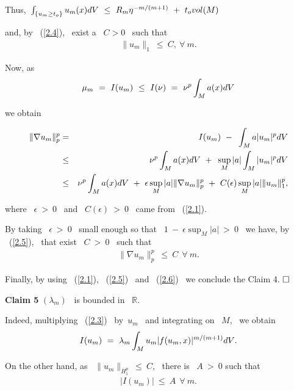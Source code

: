 \documentclass[12pt]{article}
\begin{document}
Thus, ${\displaystyle}\int_{\{u_m \geq t_o \}}{u_m(x)dV} \ \leq \ R_m\eta^{-m/(m + 1)} \ + \ t_o vol(M)$ 
{\vspace{0.2cm}}

\noindent and, by \ (\ref{2.4}), \ exist a \ $C > 0$ \ such that  
\vspace{-0.5mm}
\begin{eqnarray}
\label{2.5}
\|u_m\|_1 \ \leq \ C, \ \forall \ m. 
\end{eqnarray}

Now, as  
$$\mu_m \ = \ I(u_m) \ \leq \ I(\nu) \ = \ \nu^p{\displaystyle}\int_M{a(x)dV}$$

\noindent we obtain
\vspace{-0.5cm}

\begin{eqnarray*}
\|\nabla u_m\|^p_p & = & I(u_m) \ - \ {\displaystyle}\int_M{a|u_m|^pdV} \\
 & \leq & \nu^p{\displaystyle}\int_M{a(x)dV} \ + \ {\displaystyle}\sup_M|a|\int_M{|u_m|^pdV} \\
 & \leq & \nu^p{\displaystyle}\int_M{a(x)dV} \ + \ \epsilon \sup_M|a|\|\nabla u_m\|_p^p \ + \ C(\epsilon)\sup_M|a|\|u_m\|^p_1, 
\end{eqnarray*}

\noindent  where \ $\epsilon \ > \ 0$ \ and \ $C(\epsilon) \ > \ 0$ \ came from \ (\ref{2.1}).

By taking \ $\epsilon \ > \ 0$ \ small enough so that \ $1 \ - \ \epsilon \sup_M|a| \ > \ 0$ 
\ we have, by \ (\ref{2.5}), \ that exist \ $C \ > \ 0$ \ such that 
\vspace{-0.5mm}
\begin{eqnarray}
\label{2.6}
\|\nabla u_m\|^p_p \ \leq \ C \ \ \forall  \  m. 
\end{eqnarray}

Finally, by using \ (\ref{2.1}), \ (\ref{2.5}) \ and \ (\ref{2.6}) \ we conclude the Claim 4. {$\hfill{\Box}$}

{\bf Claim 5}
$(\lambda_m)$ \ is bounded in \ $\mathbb{R}$.

Indeed, multiplying \ (\ref{2.3}) \ by\ $u_m$ \ and integrating on \ $M$, \ we obtain
\vspace{-0.5mm}
\begin{eqnarray}
\label{2.7}
I(u_m) \ = \ \lambda_m {\displaystyle}\int_M{u_m|f(u_m,x)|^{m/(m+1)}dV}. 
\end{eqnarray}

On the other hand, as \ $\|u_m\|_{H^p_1} \ \leq \ C$, \ there is \ $A \ > \ 0$ such that 
\vspace{-0.5mm}
\begin{eqnarray}
\label{2.8}
|I(u_m)| \ \leq \ A \ \ \forall \ m. 
\end{eqnarray}
\end{document}

